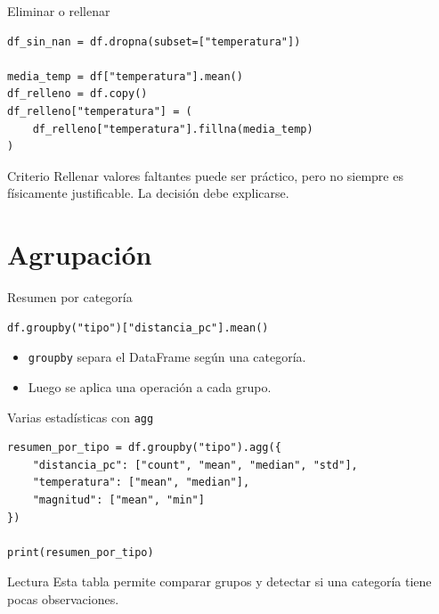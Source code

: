 \documentclass[10pt]{beamer}
\begin{document}
\begin{frame}[fragile]{Eliminar o rellenar}
\begin{verbatim}
df_sin_nan = df.dropna(subset=["temperatura"])

media_temp = df["temperatura"].mean()
df_relleno = df.copy()
df_relleno["temperatura"] = (
    df_relleno["temperatura"].fillna(media_temp)
)
\end{verbatim}

  \begin{alertblock}{Criterio}
    Rellenar valores faltantes puede ser práctico, pero no siempre es físicamente justificable. La decisión debe explicarse.
  \end{alertblock}
\end{frame}

\section{Agrupación}

\begin{frame}[fragile]{Resumen por categoría}
\begin{verbatim}
df.groupby("tipo")["distancia_pc"].mean()
\end{verbatim}

  \begin{itemize}
    \item \texttt{groupby} separa el DataFrame según una categoría.
    \item Luego se aplica una operación a cada grupo.
  \end{itemize}
\end{frame}

\begin{frame}[fragile]{Varias estadísticas con \texttt{agg}}
\begin{verbatim}
resumen_por_tipo = df.groupby("tipo").agg({
    "distancia_pc": ["count", "mean", "median", "std"],
    "temperatura": ["mean", "median"],
    "magnitud": ["mean", "min"]
})

print(resumen_por_tipo)
\end{verbatim}

  \begin{block}{Lectura}
    Esta tabla permite comparar grupos y detectar si una categoría tiene pocas observaciones.
  \end{block}
\end{frame}
\end{document}
